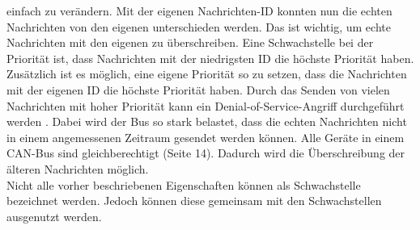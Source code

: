 einfach zu verändern. Mit der eigenen Nachrichten-ID konnten nun die 
echten Nachrichten von den eigenen unterschieden werden. Das ist wichtig, um echte Nachrichten mit den eigenen zu überschreiben. 
Eine Schwachstelle bei der Priorität ist, dass Nachrichten mit der niedrigsten ID die höchste Priorität haben. Zusätzlich ist es möglich, 
eine eigene Priorität so zu setzen, dass die Nachrichten mit der eigenen ID die höchste Priorität haben. Durch das Senden von
vielen Nachrichten mit hoher Priorität kann ein Denial-of-Service-Angriff durchgeführt werden \cite{Murvay2018}. 
Dabei wird der Bus so stark belastet,
dass die echten Nachrichten nicht in einem angemessenen Zeitraum gesendet werden können. 
Alle Geräte in einem CAN-Bus sind gleichberechtigt\cite{Voss2008} (Seite 14). Dadurch wird die Überschreibung der älteren Nachrichten möglich.\\
Nicht alle vorher beschriebenen Eigenschaften können als Schwachstelle bezeichnet werden. Jedoch können diese gemeinsam mit den
Schwachstellen ausgenutzt werden. \\

